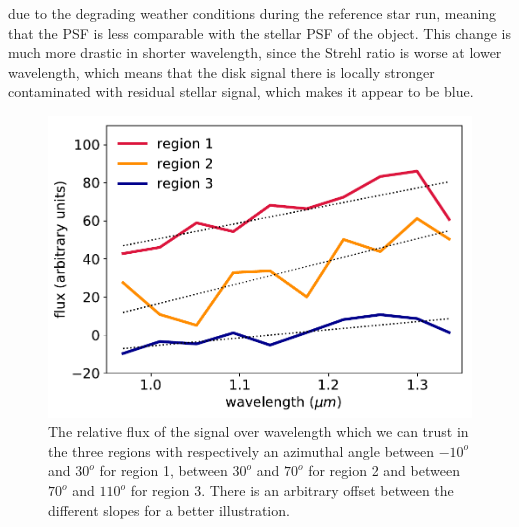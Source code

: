 \documentclass[twoside,single,12pt]{lion-msc}
\begin{document}
\noindent
due to the degrading weather conditions during the reference star run, meaning that the PSF is less comparable with the stellar PSF of the object. This change is much more drastic in shorter wavelength, since the Strehl ratio is worse at lower wavelength, which means that the disk signal there is locally stronger contaminated with residual stellar signal, which makes it appear to be blue.
\bigskip

\begin{figure}
\vspace{-6mm}
\centering
\includegraphics[width=1\linewidth]{slopedifreg}
\caption{The relative flux of the signal over wavelength which we can trust in the three regions with respectively an azimuthal angle between $-10^o$ and $30^o$ for region 1, between $30^o$ and $70^o$ for region 2 and between $70^o$ and $110^o$ for region 3. There is an arbitrary offset between the different slopes for a better illustration.}
\label{fig:slopedifreg}
\vspace{-4mm}
\end{figure}
\end{document}
